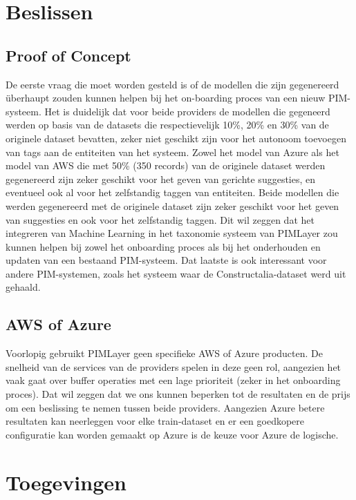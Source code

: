 \documentclass[a0,portrait]{a0poster}
\begin{document}
\begin{multicols}{2}
\section*{Beslissen}
\color{HoGentAccent1} 
\subsection*{Proof of Concept}
\color{black}
De eerste vraag die moet worden gesteld is of de modellen die zijn gegenereerd überhaupt zouden kunnen helpen bij het on-boarding proces van een nieuw PIM-systeem. Het is duidelijk dat voor beide providers de modellen die gegeneerd werden op basis van de datasets die respectievelijk 10\%, 20\% en 30\% van de originele dataset bevatten, zeker niet geschikt zijn voor het autonoom toevoegen van tags aan de entiteiten van het systeem. Zowel het model van Azure als het model van AWS die met 50\% (350 records) van de originele dataset werden gegenereerd zijn zeker geschikt voor het geven van gerichte suggesties, en eventueel ook al voor het zelfstandig taggen van entiteiten. Beide modellen die werden gegenereerd met de originele dataset zijn zeker geschikt voor het geven van suggesties en ook voor het zelfstandig taggen. Dit wil zeggen dat het integreren van Machine Learning in het taxonomie systeem van PIMLayer zou kunnen helpen bij zowel het onboarding proces als bij het onderhouden en updaten van een bestaand PIM-systeem. Dat laatste is ook interessant voor andere PIM-systemen, zoals het systeem waar de Constructalia-dataset werd uit gehaald. 
\color{HoGentAccent1} 
\subsection*{AWS of Azure}
\color{black}
Voorlopig gebruikt PIMLayer geen specifieke AWS of Azure producten. De snelheid van de services van de providers spelen in deze geen rol, aangezien het vaak gaat over buffer operaties met een lage prioriteit (zeker in het onboarding proces). Dat wil zeggen dat we ons kunnen beperken tot de resultaten en de prijs om een beslissing te nemen tussen beide providers. 
Aangezien Azure betere resultaten kan neerleggen voor elke train-dataset en er een goedkopere configuratie kan worden gemaakt op Azure is de keuze voor Azure de logische. 

\color{HoGentAccent1} 
\section*{Toegevingen}
\color{HoGentAccent1} 

\end{multicols}
\end{document}
